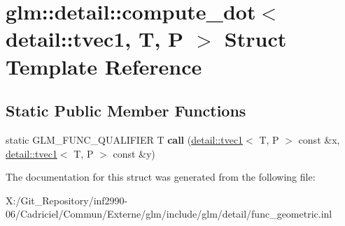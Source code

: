 \hypertarget{structglm_1_1detail_1_1compute__dot_3_01detail_1_1tvec1_00_01_t_00_01_p_01_4}{\section{glm\-:\-:detail\-:\-:compute\-\_\-dot$<$ detail\-:\-:tvec1, T, P $>$ Struct Template Reference}
\label{structglm_1_1detail_1_1compute__dot_3_01detail_1_1tvec1_00_01_t_00_01_p_01_4}
}
\subsection*{Static Public Member Functions}
\begin{DoxyCompactItemize}
\item 
\hypertarget{structglm_1_1detail_1_1compute__dot_3_01detail_1_1tvec1_00_01_t_00_01_p_01_4_a8a857cb8e3ad91ffec9e5d2e8517be41}{static G\-L\-M\-\_\-\-F\-U\-N\-C\-\_\-\-Q\-U\-A\-L\-I\-F\-I\-E\-R T {\bfseries call} (\hyperlink{structglm_1_1detail_1_1tvec1}{detail\-::tvec1}$<$ T, P $>$ const \&x, \hyperlink{structglm_1_1detail_1_1tvec1}{detail\-::tvec1}$<$ T, P $>$ const \&y)}\label{structglm_1_1detail_1_1compute__dot_3_01detail_1_1tvec1_00_01_t_00_01_p_01_4_a8a857cb8e3ad91ffec9e5d2e8517be41}

\end{DoxyCompactItemize}


The documentation for this struct was generated from the following file\-:\begin{DoxyCompactItemize}
\item 
X\-:/\-Git\-\_\-\-Repository/inf2990-\/06/\-Cadriciel/\-Commun/\-Externe/glm/include/glm/detail/func\-\_\-geometric.\-inl\end{DoxyCompactItemize}
